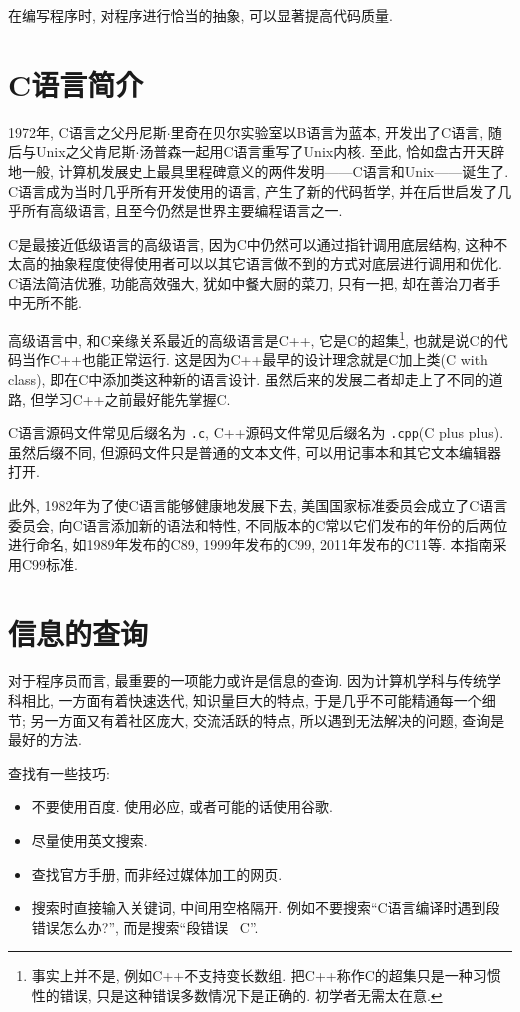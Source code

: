        在编写程序时, 对程序进行恰当的抽象, 可以显著提高代码质量.

    \section{C语言简介} \label{C语言简介}
        1972年, C语言之父丹尼斯$\cdot$里奇在贝尔实验室以B语言为蓝本, 开发出了C语言, 随后与Unix之父肯尼斯$\cdot$汤普森一起用C语言重写了Unix内核. 至此, 恰如盘古开天辟地一般, 计算机发展史上最具里程碑意义的两件发明——C语言和Unix——诞生了. C语言成为当时几乎所有开发使用的语言, 产生了新的代码哲学, 并在后世启发了几乎所有高级语言, 且至今仍然是世界主要编程语言之一. 
        
        C是最接近低级语言的高级语言, 因为C中仍然可以通过指针调用底层结构, 这种不太高的抽象程度使得使用者可以以其它语言做不到的方式对底层进行调用和优化. C语法简洁优雅, 功能高效强大, 犹如中餐大厨的菜刀, 只有一把, 却在善治刀者手中无所不能.

        高级语言中, 和C亲缘关系最近的高级语言是C++, 它是C的超集\footnote{事实上并不是, 例如C++不支持变长数组. 把C++称作C的超集只是一种习惯性的错误, 只是这种错误多数情况下是正确的. 初学者无需太在意.}, 也就是说C的代码当作C++也能正常运行. 这是因为C++最早的设计理念就是C加上类(C with class), 即在C中添加类这种新的语言设计. 虽然后来的发展二者却走上了不同的道路, 但学习C++之前最好能先掌握C.

        C语言源码文件常见后缀名为 \texttt{.c}, C++源码文件常见后缀名为 \texttt{.cpp}(C plus plus). 虽然后缀不同, 但源码文件只是普通的文本文件, 可以用记事本和其它文本编辑器打开.

        此外, 1982年为了使C语言能够健康地发展下去, 美国国家标准委员会成立了C语言委员会, 向C语言添加新的语法和特性, 不同版本的C常以它们发布的年份的后两位进行命名, 如1989年发布的C89, 1999年发布的C99, 2011年发布的C11等. 本指南采用C99标准.

    \section{信息的查询} \label{信息的查询}
        对于程序员而言, 最重要的一项能力或许是信息的查询. 因为计算机学科与传统学科相比, 一方面有着快速迭代, 知识量巨大的特点, 于是几乎不可能精通每一个细节; 另一方面又有着社区庞大, 交流活跃的特点, 所以遇到无法解决的问题, 查询是最好的方法.

        查找有一些技巧:
        \vspace*{-13pt}
        \begin{itemize}
            \item 不要使用百度. 使用必应, 或者可能的话使用谷歌.
            \item 尽量使用英文搜索.
            \item 查找官方手册, 而非经过媒体加工的网页.
            \item 搜索时直接输入关键词, 中间用空格隔开. 例如不要搜索``C语言编译时遇到段错误怎么办?'', 而是搜索``段错误 \ C''.
        \end{itemize}

